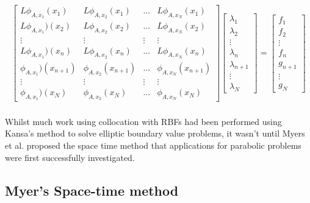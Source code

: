 \documentclass[a4paper]{amsart}
\begin{document}
\begin{align*}
\begin{bmatrix}
 L \phi_{A,x_{1}}(x_{1}) &L \phi_{A, x_{2}}(x_{1}) &... &L \phi_{A, x_{N}}(x_{1})\\
 L \phi_{A, x_{1}})(x_{2}) &L \phi_{A, x_{2}}(x_{2}) &... &L \phi_{A, x_{N}}(x_{2})\\
\vdots &\vdots &\vdots &\vdots\\
 L \phi_{A, x_{1}})(x_{n}) &L \phi_{A, x_{2}}(x_{n}) &... &L \phi_{A, x_{N}}(x_{n})\\
 \phi_{A, x_{1}})(x_{n+1}) &\phi_{A, x_{2}}(x_{n+1}) &...  &\phi_{A, x_{N}}(x_{n+1})\\
\vdots &\vdots &\vdots &\vdots\\
 \phi_{A, x_{1}})(x_{N})  &\phi_{A, x_{2}}(x_{N}) &...  &\phi_{A, x_{N}}(x_{N})
\end{bmatrix}
\begin{bmatrix}
\lambda_{1}\\
\lambda_{2}\\
\vdots\\
\lambda_{n}\\
\lambda_{n+1}\\
\vdots\\
\lambda_{N}
\end{bmatrix}
=
\begin{bmatrix}
f_{1}\\
f_{2}\\
\vdots\\
f_{n}\\
g_{n+1}\\
\vdots\\
g_{N}
\end{bmatrix}
\end{align*}\\


Whilst much work using collocation with RBFs had been performed using Kansa's method to solve elliptic boundary value problems, it wasn't until Myers et al. \cite{rbf0} proposed the space time method that applications for parabolic problems were first successfully investigated.


\subsection{Myer's Space-time method}
\end{document}
